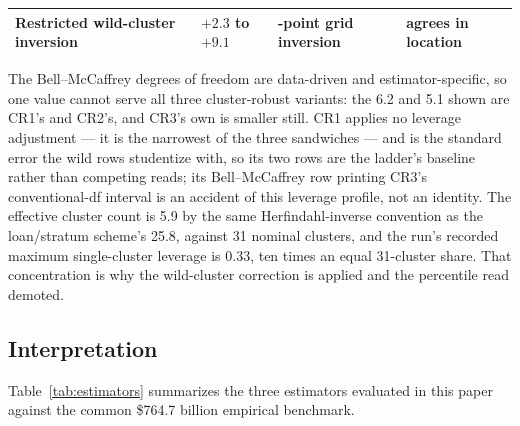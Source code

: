 \documentclass[12pt]{article}
\begin{document}
\begin{table}[!t]
\begin{threeparttable}
\begin{tabular}{@{}>{\raggedright\arraybackslash}p{4.0cm}>{\raggedright\arraybackslash}p{2.3cm}>{\raggedright\arraybackslash}p{2.8cm}>{\raggedright\arraybackslash}p{4.4cm}@{}}
Restricted wild-cluster inversion & $+2.3$ to $+9.1$ & 401-point grid inversion & agrees in location \\
\bottomrule
\end{tabular}
\begin{tablenotes}[flushleft]\footnotesize
\item The Bell--McCaffrey degrees of freedom are data-driven and estimator-specific, so one value cannot serve all three cluster-robust variants: the 6.2 and 5.1 shown are CR1's and CR2's, and CR3's own is smaller still. CR1 applies no leverage adjustment --- it is the narrowest of the three sandwiches --- and is the standard error the wild rows studentize with, so its two rows are the ladder's baseline rather than competing reads; its Bell--McCaffrey row printing CR3's conventional-df interval is an accident of this leverage profile, not an identity. The effective cluster count is 5.9 by the same Herfindahl-inverse convention as the loan/stratum scheme's 25.8, against 31 nominal clusters, and the run's recorded maximum single-cluster leverage is 0.33, ten times an equal 31-cluster share. That concentration is why the wild-cluster correction is applied and the percentile read demoted.
\end{tablenotes}
\end{threeparttable}
\end{table}

\subsection{Interpretation}\label{sec:hazard-interp}

Table~\ref{tab:estimators} summarizes the three estimators evaluated in this paper against the common \$764.7 billion empirical benchmark.
\end{document}
